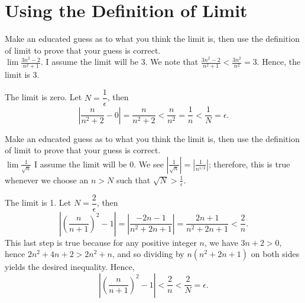 \documentclass[12pt]{book}
\newenvironment{exercise}[2][Exercise]{\begin{trivlist}
\item[\hskip \labelsep {\bfseries #1}\hskip \labelsep {\bfseries #2.}]}{\end{trivlist}}
\begin{document}
\section{Using the Definition of Limit}


\begin{exercise}{2.2.1}
Make an educated guess as to what you think the limit is, then use the definition of limit to prove that your guess is correct.\\

$\lim \frac{3n^2 -2}{n^2 +1}$. I assume the limit will be $3$. We note that $\frac{3n^2 - 2}{n^2+1} <  \frac{3n^2}{n^2} = 3$. Hence, the limit is 3.
\end{exercise}

\begin{exercise}{2.2.2}
The limit is zero. Let $N = \dfrac{1}{\epsilon}$, then $$\left| \dfrac{n}{n^2 + 2} - 0 \right| = \dfrac{n}{n^2+2} < \dfrac{n}{n^2} = \dfrac{1}{n} < \dfrac{1}{N} = \epsilon.$$
\end{exercise}

\begin{exercise}{2.2.3}
Make an educated guess as to what you think the limit is, then use the definition of limit to prove that your guess is correct.\\

$\lim \frac{1}{\sqrt{n}} $ I assume the limit will be $0$. We see $| \frac{1}{\sqrt{n}}| = | \frac{1}{n^{1/2}}|$; therefore, this is true whenever we choose an $n>N$ such that $\sqrt{N}> \frac{1}{\epsilon}$.
\end{exercise}

\begin{exercise}{2.2.4}
The limit is 1. Let $N = \dfrac{2}{\epsilon}$, then $$\left| \left(\dfrac{n}{n+1}\right)^2 - 1 \right| = \left| \dfrac{-2n-1}{n^2 + 2n + 1} \right| = \dfrac{2n+1}{n^2 + 2n + 1}< \dfrac{2}{n}.$$ This last step is true because for any positive integer $n$, we have $3n+2 > 0,$ hence $2n^2 + 4n + 2 > 2n^2 + n$, and so dividing by $n(n^2 + 2n + 1)$ on both sides yields the desired inequality. Hence, $$\left| \left(\dfrac{n}{n+1}\right)^2 - 1 \right| < \dfrac{2}{n} < \dfrac{2}{N} = \epsilon.$$
\end{exercise}
\end{document}
